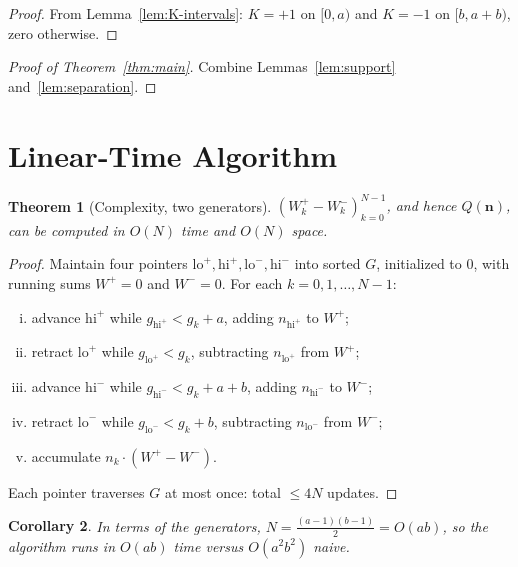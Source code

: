 \documentclass[11pt,a4paper]{amsart}
\theoremstyle{plain}
\newtheorem{theorem}{Theorem}[section]
\newtheorem{corollary}[theorem]{Corollary}
\theoremstyle{definition}
\theoremstyle{remark}
\begin{document}
\begin{proof}
From Lemma~\ref{lem:K-intervals}: $K = +1$ on $[0,a)$ and $K = -1$
on $[b, a+b)$, zero otherwise.
\end{proof}

\begin{proof}[Proof of Theorem~\ref{thm:main}]
Combine Lemmas~\ref{lem:support} and~\ref{lem:separation}.
\end{proof}

\section{Linear-Time Algorithm}
\label{sec:algorithm}

\begin{theorem}[Complexity, two generators]
\label{thm:complexity}
$(W^+_k - W^-_k)_{k=0}^{N-1}$, and hence $Q(\mathbf{n})$,
can be computed in $O(N)$ time and $O(N)$ space.
\end{theorem}

\begin{proof}
Maintain four pointers
$\mathrm{lo}^+, \mathrm{hi}^+, \mathrm{lo}^-, \mathrm{hi}^-$
into sorted $G$, initialized to $0$, with running sums $W^+ = 0$
and $W^- = 0$. For each $k = 0, 1, \ldots, N-1$:
\begin{enumerate}[(i)]
\item advance $\mathrm{hi}^+$ while $g_{\mathrm{hi}^+} < g_k + a$,
      adding $n_{\mathrm{hi}^+}$ to $W^+$;
\item retract $\mathrm{lo}^+$ while $g_{\mathrm{lo}^+} < g_k$,
      subtracting $n_{\mathrm{lo}^+}$ from $W^+$;
\item advance $\mathrm{hi}^-$ while $g_{\mathrm{hi}^-} < g_k + a + b$,
      adding $n_{\mathrm{hi}^-}$ to $W^-$;
\item retract $\mathrm{lo}^-$ while $g_{\mathrm{lo}^-} < g_k + b$,
      subtracting $n_{\mathrm{lo}^-}$ from $W^-$;
\item accumulate $n_k \cdot (W^+ - W^-)$.
\end{enumerate}
Each pointer traverses $G$ at most once: total $\leq 4N$ updates.
\end{proof}

\begin{corollary}
\label{cor:complexity}
In terms of the generators, $N = \tfrac{(a-1)(b-1)}{2} = O(ab)$,
so the algorithm runs in $O(ab)$ time versus $O(a^2b^2)$ naive.
\end{corollary}
\end{document}
